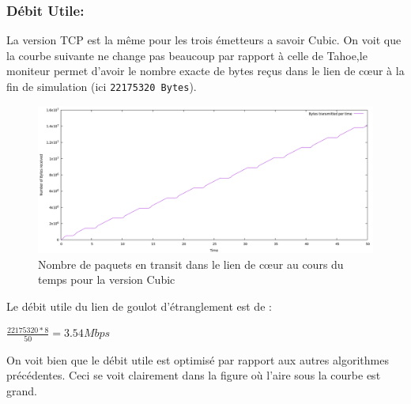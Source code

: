 \documentclass[a4paper,12pt]{article}
\begin{document}
\subsubsection{Débit Utile:}
La version TCP est la même pour les trois émetteurs a savoir Cubic. On voit que la courbe suivante ne change pas beaucoup par rapport à celle de Tahoe,le moniteur permet d'avoir le nombre exacte de bytes reçus dans le lien de cœur à la fin de simulation (ici \texttt{22175320 Bytes}).  
\begin{figure}[H]
\centering
\includegraphics[width=16cm]{img/paquets_received_cubic.png}
\caption{Nombre de paquets en transit dans le lien de cœur au cours du temps pour la version Cubic}
\end{figure}
Le débit utile du lien de goulot d'étranglement est de : 
\begin{center}
	$\frac{22175320*8}{50} = 3.54 Mbps$ 
\end{center}
On voit bien que le débit utile est optimisé par rapport aux autres algorithmes précédentes. Ceci se voit clairement dans la figure où l'aire sous la courbe est grand.
\end{document}
